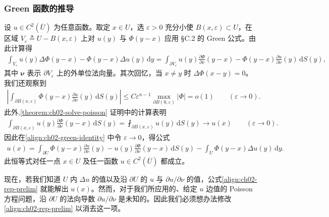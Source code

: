 \documentclass[../../main.tex]{subfiles}
\begin{document}
\subsubsection{Green 函数的推导}

设 $u\in C^2(\overline{U})$ 为任意函数。取定 $x\in U$，选 $\varepsilon>0$ 充分小使 $B(x,\varepsilon)\subset U$，在区域 $V_\varepsilon\triangleq U-B(x,\varepsilon)$ 上对 $u(y)$ 与 $\Phi(y-x)$ 应用 \S C.2 的 Green 公式。由此计算得
\begin{align}\label{align:ch02-green-identity}
\int_{V_\varepsilon}u(y)\Delta\Phi(y-x)-\Phi(y-x)\Delta u(y)\,\mathrm{d}y
=\int_{\partial V_\varepsilon}u(y)\frac{\partial\Phi}{\partial\nu}(y-x)-\Phi(y-x)\frac{\partial u}{\partial\nu}(y)\,\mathrm{d}S(y),
\end{align}
其中 $\boldsymbol{\nu}$ 表示 $\partial V_\varepsilon$ 上的外单位法向量。其次回忆，当 $x\neq y$ 时 $\Delta\Phi(x-y)=0$。我们还观察到
\begin{align*}
\left|\int_{\partial B(x,\varepsilon)}\Phi(y-x)\frac{\partial u}{\partial\nu}(y)\,\mathrm{d}S(y)\right|\leqslant C\varepsilon^{n-1}\max_{\partial B(0,\varepsilon)}|\Phi|=o(1) \qquad (\varepsilon\to 0).
\end{align*}
此外,\cref{theorem:ch02-solve-poisson} 证明中的计算表明
\begin{align*}
\int_{\partial B(x,\varepsilon)}u(y)\frac{\partial\Phi}{\partial\nu}(y-x)\,\mathrm{d}S(y)=\fint_{\partial B(x,\varepsilon)}u(y)\,\mathrm{d}S(y)\to u(x) \qquad (\varepsilon\to 0).
\end{align*}
因此在\eqref{align:ch02-green-identity} 中令 $\varepsilon\to 0$，得公式
\begin{align}\label{align:ch02-rep-prelim}
u(x)=\int_{\partial U}\Phi(y-x)\frac{\partial u}{\partial\nu}(y)-u(y)\frac{\partial\Phi}{\partial\nu}(y-x)\,\mathrm{d}S(y)
-\int_U\Phi(y-x)\Delta u(y)\,\mathrm{d}y.
\end{align}
此恒等式对任一点 $x\in U$ 及任一函数 $u\in C^2(\overline{U})$ 都成立。

现在，若我们知道 $U$ 内 $\Delta u$ 的值以及沿 $\partial U$ 的 $u$ 与 $\partial u/\partial\nu$ 的值，公式\eqref{align:ch02-rep-prelim} 就能解出 $u(x)$。然而，对于我们所应用的、给定 $u$ 边值的 Poisson 方程问题，沿 $\partial U$ 的法向导数 $\partial u/\partial\nu$ 是未知的。因此我们必须想办法修改\eqref{align:ch02-rep-prelim} 以消去这一项。
\end{document}
